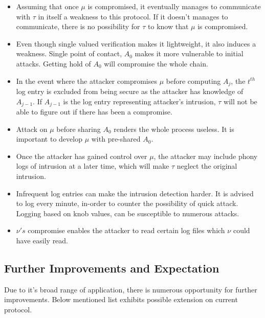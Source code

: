\documentclass[12pt, letter]{article}
\begin{document}
\begin{itemize}
    \item Assuming that once $\mu$ is compromised, it eventually manages to communicate with $\tau$ in itself a weakness to this protocol. If it doesn't manages to communicate, there is no possibility for $\tau$ to know that $\mu$ is compromised.
    
    \item Even though single valued verification makes it lightweight, it also induces a weakness. Single point of contact, $A_0$ makes it more vulnerable to initial attacks. Getting hold of $A_0$ will compromise the whole chain.
    
    \item In the event where the attacker compromises $\mu$ before computing $A_j$, the $t^{th}$ log entry is excluded from being secure as the attacker has knowledge of $A_{j-1}$. If $A_{j-1}$ is the log entry representing attacker's intrusion, $\tau$ will not be able to figure out if there has been a compromise.
    
    \item Attack on $\mu$ before sharing $A_0$ renders the whole process useless. It is important to develop $\mu$ with pre-shared $A_0$.
    
    \item Once the attacker has gained control over $\mu$, the attacker may include phony logs of intrusion at a later time, which will make $\tau$ neglect the original intrusion.
    
    \item Infrequent log entries can make the intrusion detection harder. It is advised to log every minute, in-order to counter the possibility of quick attack. Logging based on knob values, can be susceptible to numerous attacks.
    
    \item $\nu's$ compromise enables the attacker to read certain log files which $\nu$ could have easily read.
    
\end{itemize}

\subsection{Further Improvements and Expectation}

Due to it's broad range of application, there is numerous opportunity for further improvements. Below mentioned list exhibits possible extension on current protocol.
\end{document}
